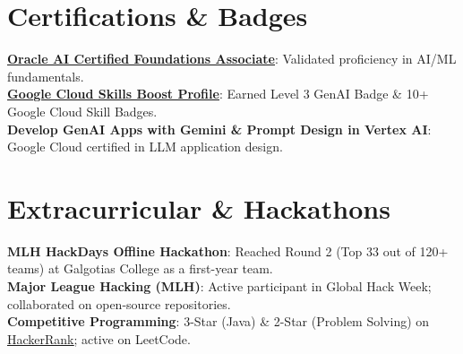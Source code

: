 \documentclass[letterpaper,11pt]{article}
\begin{document}
\section{Certifications \& Badges}
 \begin{itemize}[leftmargin=0.15in, label={}]
    \small{\item{
     \textbf{\href{https://catalog-education.oracle.com/ords/certview/sharebadge?id=2EC9B50AAE0E57C91B9A0D7C3E27276E32A1D2760D8FB299F208125ADC931D38}{\underline{{Oracle AI Certified Foundations Associate}}}}{: Validated proficiency in AI/ML fundamentals.} \\
     \textbf{\href{https://www.skills.google/public_profiles/7c538f5b-2024-4d94-a220-233117c019b1}{\underline{{Google Cloud Skills Boost Profile}}}}{: Earned Level 3 GenAI Badge \& 10+ Google Cloud Skill Badges.} \\
     \textbf{Develop GenAI Apps with Gemini \& Prompt Design in Vertex AI}{: Google Cloud certified in LLM application design.}
    }}
 \end{itemize}

\section{Extracurricular \& Hackathons}
 \begin{itemize}[leftmargin=0.15in, label={}]
    \small{\item{
     \textbf{MLH HackDays Offline Hackathon}{: Reached Round 2 (Top 33 out of 120+ teams) at Galgotias College as a first-year team.} \\
     \textbf{Major League Hacking (MLH)}{: Active participant in Global Hack Week; collaborated on open-source repositories.} \\
     \textbf{Competitive Programming}{: 3-Star (Java) \& 2-Star (Problem Solving) on \href{https://www.hackerrank.com/profile/codegrounds666}{\underline{HackerRank}}; active on LeetCode.}
    }}
 \end{itemize}
\end{document}
